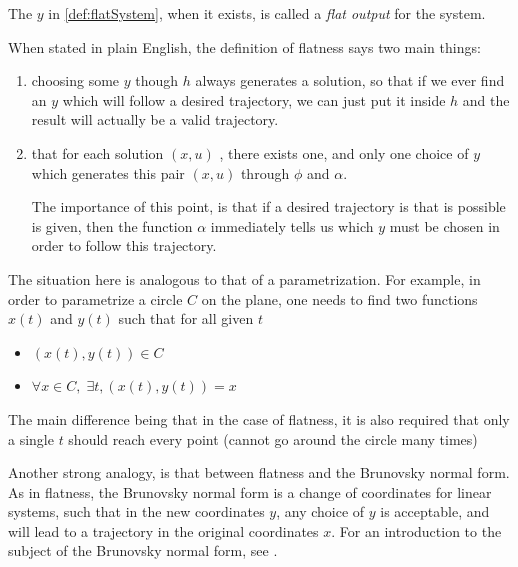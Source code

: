 \documentclass[12pt]{article}
\begin{document}
\begin{definition}\label{def:flatOutput}
  The $y$ in \ref{def:flatSystem}, when it exists, is called a \emph{flat output}
  for the system.
\end{definition}

\begin{remark}
  When stated in plain English, the definition of flatness says two main things:
  \begin{enumerate}
    \item choosing some $y$ though $h$ always generates a solution, so that if we
    ever find an $y$ which will follow a desired trajectory, we can just put it
    inside $h$ and the result will actually be a valid trajectory.
    
    \item that for each solution $(x,u)$ , there exists one, and only one choice of
      $y$ which generates this pair $(x,u)$ through $\phi$ and $\alpha$.
      
      The importance of this point, is that if a desired trajectory is that is
      possible is given, then the function $\alpha$ immediately tells us which 
      $y$ must be chosen in order to follow this trajectory.
  \end{enumerate}
  
  The situation here is analogous to that of a parametrization. For example, in order
  to parametrize a circle $C$ on the plane, one needs to find two functions $x(t)$ and
  $y(t)$ such that for all given $t$
  \begin{itemize}
    \item $(x(t),y(t)) \in C$
    \item $\forall x \in C, \; \exists t, (x(t),y(t)) = x$
  \end{itemize}
  The main difference being that in the case of flatness, it is also required that 
  only a single $t$ should reach every point (cannot go around the circle many times)

  Another strong analogy, is that between flatness and the Brunovsky normal form.
  As in flatness, the Brunovsky normal form is a change of coordinates for linear
  systems, such that in the new coordinates $y$, any choice of $y$ is acceptable,
  and will lead to a trajectory in the original coordinates $x$. For an introduction
  to the subject of the Brunovsky normal form, see \cite{BC11}.

\end{remark}
\end{document}
